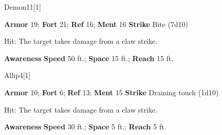 \begin{monsection}[Bebelith]{Demon}{11}[1]
\begin{spellcontent}
\begin{spelltargetinginfo}
\pari \textbf{Armor} 19; \textbf{Fort} 21; \textbf{Ref} 16; \textbf{Ment} 16
\pari \textbf{Strike} Bite  (7d10)
\end{spelltargetinginfo}
\begin{spelleffects}
\pari {}
\par Hit: The target takes damage from a claw strike.
\end{spelleffects}
\end{spellcontent}
\begin{spellfooter}
\pari \textbf{Awareness} 
\pari \textbf{Speed} 50 ft.; \textbf{Space} 15 ft.; \textbf{Reach} 15 ft.
\end{spellfooter}
\end{monsection}
\begin{monsection}{Allip}{4}[1]
\begin{spellcontent}
\begin{spelltargetinginfo}
\pari \textbf{Armor} 10; \textbf{Fort} 6; \textbf{Ref} 13; \textbf{Ment} 15
\pari \textbf{Strike} Draining touch  (1d10)
\end{spelltargetinginfo}
\begin{spelleffects}
\pari {}
\par Hit: The target takes damage from a claw strike.
\end{spelleffects}
\end{spellcontent}
\begin{spellfooter}
\pari \textbf{Awareness} 
\pari \textbf{Speed} 30 ft.; \textbf{Space} 5 ft.; \textbf{Reach} 5 ft.
\end{spellfooter}
\end{monsection}